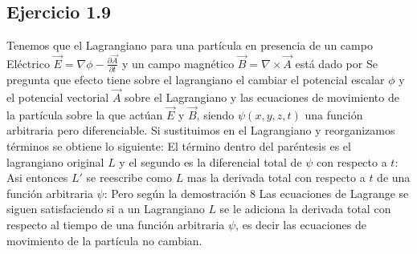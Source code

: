 \subsection*{Ejercicio 1.9 }
Tenemos que el Lagrangiano para una part\'icula en presencia de un campo El\'ectrico 
$\vec E=\nabla \phi -\frac{\partial \vec A}{\partial t}$
y un campo magn\'etico  $\vec B=\nabla \times \vec A$ est\'a dado por 
Se pregunta que efecto tiene sobre el lagrangiano el cambiar el potencial escalar $\phi$ y el potencial vectorial $\vec A$ 
sobre el Lagrangiano y las ecuaciones de movimiento de la part\'icula sobre la que act\'uan $\vec E$ y $\vec B$, siendo $\psi(x,y,z,t)$ una funci\'on arbitraria pero diferenciable.
Si sustituimos en el Lagrangiano y reorganizamos t\'erminos se obtiene lo siguiente:
El t\'ermino dentro del par\'entesis es el lagrangiano original $L$ y el segundo es la diferencial total  de $\psi$ con respecto a $t$:
Asi entonces $L'$ se reescribe como $L$ mas la derivada total con respecto a $t$ de una funci\'on arbitraria $\psi$:
Pero seg\'un la demostraci\'on 8 Las ecuaciones de Lagrange se siguen satisfaciendo si a un Lagrangiano $L$ se le adiciona la derivada total con respecto al tiempo de una funci\'on arbitraria $\psi$, es decir las ecuaciones de movimiento de la part\'icula no cambian.


